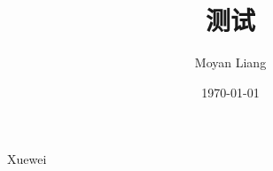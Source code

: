\documentclass[cn]{inkthesis}
\title{测试}
\author{Moyan Liang}
\institute{Ink \LaTeX Group}
\date{\today}
\begin{document}
	\begin{titlepage}
		
		\begin{flushright}
			Xuewei
		\end{flushright}
	\end{titlepage}
\end{document}
